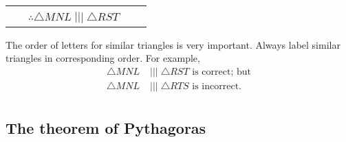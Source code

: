 \begin{table}[H]
\begin{center}
\begin{tabular}{|m{3.1cm}|m{4cm}|m{6cm}|}
\begin{center}
\newline
$\frac{MN}{RS} = \frac{ML}{RT} = \frac{NL}{ST}$ \\
 $~~~~~~~\therefore \triangle MNL\;|||\;\triangle RST$ \newline 
 \end{center} \\ \hline 
\end{tabular}
      \end{center}
\end{table}       

The order of letters for similar triangles is very important. Always label similar triangles in corresponding order. For example,
\begin{align*}
  \triangle MNL&\;|||\;\triangle RST \mbox{ is correct; but}\\
  \triangle MNL&\;|||\;\triangle RTS \mbox{ is incorrect.}\\
\end{align*}

\subsection*{The theorem of Pythagoras}
     
\begin{center}
\end{center}

